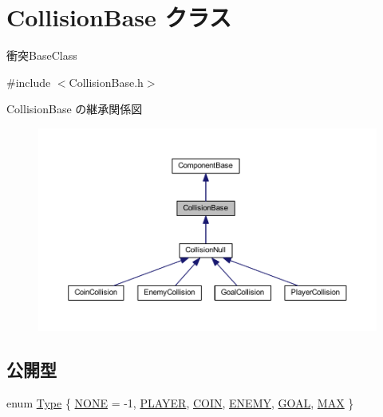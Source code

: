\hypertarget{class_collision_base}{}\section{Collision\+Base クラス}
\label{class_collision_base}


衝突\+Base\+Class  




{\ttfamily \#include $<$Collision\+Base.\+h$>$}



Collision\+Base の継承関係図\nopagebreak
\begin{figure}[H]
\begin{center}
\leavevmode
\includegraphics[width=350pt]{class_collision_base__inherit__graph}
\end{center}
\end{figure}
\subsection*{公開型}
\begin{DoxyCompactItemize}
\item 
enum \mbox{\hyperlink{class_collision_base_a18dc0d5461742083ca12013fe9ff1a20}{Type}} \{ \newline
\mbox{\hyperlink{class_collision_base_a18dc0d5461742083ca12013fe9ff1a20a2682042c400780d05da0db180ef89526}{N\+O\+NE}} = -\/1, 
\mbox{\hyperlink{class_collision_base_a18dc0d5461742083ca12013fe9ff1a20ae1aee076cb40136904a2300425bba493}{P\+L\+A\+Y\+ER}}, 
\mbox{\hyperlink{class_collision_base_a18dc0d5461742083ca12013fe9ff1a20aeda009ba3599abbdb45a16ecaaf075e5}{C\+O\+IN}}, 
\mbox{\hyperlink{class_collision_base_a18dc0d5461742083ca12013fe9ff1a20a90a5e8c5c8fa7a3ba38c80b583de37ce}{E\+N\+E\+MY}}, 
\newline
\mbox{\hyperlink{class_collision_base_a18dc0d5461742083ca12013fe9ff1a20a82a11a1a3c44c82bd7909f48ed57fa62}{G\+O\+AL}}, 
\mbox{\hyperlink{class_collision_base_a18dc0d5461742083ca12013fe9ff1a20aa7c59b2c2f20cbc76a01c38a1ebb6fea}{M\+AX}}
 \}
\end{DoxyCompactItemize}
